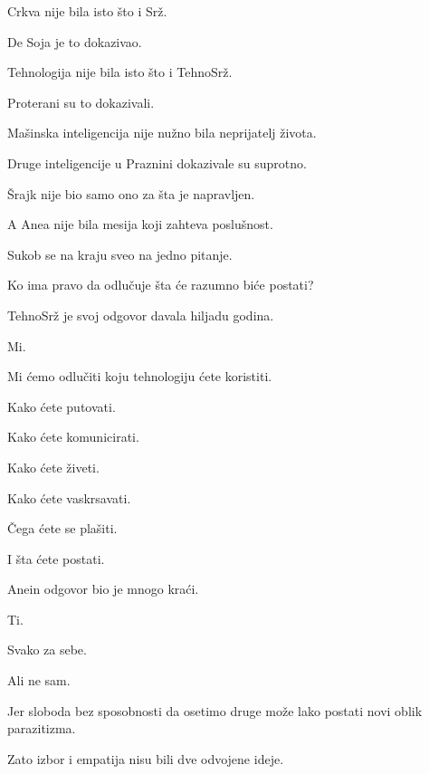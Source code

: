 \bigskip

Crkva nije bila isto što i Srž.

De Soja je to dokazivao.

\bigskip

Tehnologija nije bila isto što i TehnoSrž.

Proterani su to dokazivali.

\bigskip

Mašinska inteligencija nije nužno bila neprijatelj života.

Druge inteligencije u Praznini dokazivale su suprotno.

\bigskip

Šrajk nije bio samo ono za šta je napravljen.

\bigskip

A Anea nije bila mesija koji zahteva poslušnost.

\bigskip

Sukob se na kraju sveo na jedno pitanje.

\bigskip

Ko ima pravo da odlučuje šta će razumno biće postati?

\bigskip

TehnoSrž je svoj odgovor davala hiljadu godina.

\bigskip

Mi.

\bigskip

Mi ćemo odlučiti koju tehnologiju ćete koristiti.

Kako ćete putovati.

Kako ćete komunicirati.

Kako ćete živeti.

Kako ćete vaskrsavati.

Čega ćete se plašiti.

I šta ćete postati.

\bigskip

Anein odgovor bio je mnogo kraći.

\bigskip

Ti.

\bigskip

Svako za sebe.

\bigskip

Ali ne sam.

\bigskip

Jer sloboda bez sposobnosti da osetimo druge može lako postati novi oblik parazitizma.

\bigskip

Zato izbor i empatija nisu bili dve odvojene ideje.

